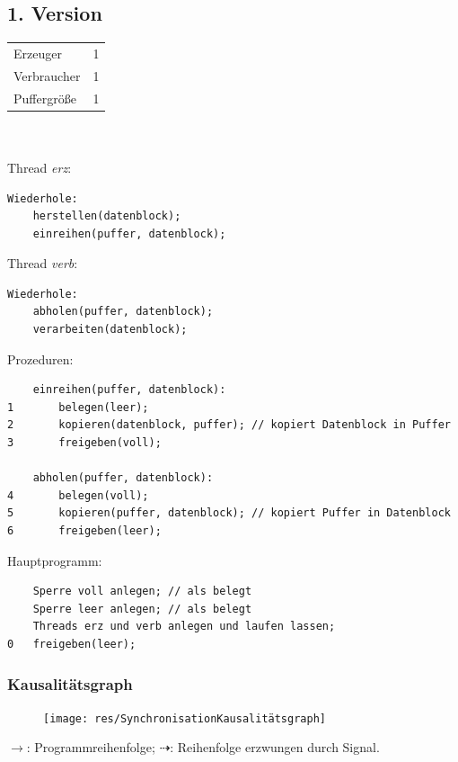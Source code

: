 \subsection*{1. Version}
\begin{tabular}{l r}
Erzeuger & 1\\
Verbraucher & 1\\
Puffergröße & 1
\end{tabular}\\
\\
Thread \emph{erz}:
\begin{lstlisting}
Wiederhole:
	herstellen(datenblock);
	einreihen(puffer, datenblock);
\end{lstlisting}
Thread \emph{verb}:
\begin{lstlisting}
Wiederhole:
	abholen(puffer, datenblock);
	verarbeiten(datenblock);
\end{lstlisting}

Prozeduren:
\begin{lstlisting}
	einreihen(puffer, datenblock):
1		belegen(leer);
2		kopieren(datenblock, puffer); // kopiert Datenblock in Puffer
3		freigeben(voll);

	abholen(puffer, datenblock):
4		belegen(voll);
5		kopieren(puffer, datenblock); // kopiert Puffer in Datenblock
6		freigeben(leer);
\end{lstlisting}

Hauptprogramm:
\begin{lstlisting}
	Sperre voll anlegen; // als belegt
	Sperre leer anlegen; // als belegt
	Threads erz und verb anlegen und laufen lassen;
0	freigeben(leer);
\end{lstlisting}

\subsubsection*{Kausalitätsgraph}
\begin{figure}[H]
	\begin{center}
		\texttt{[image: res/SynchronisationKausalitätsgraph]}
		\label{pic:synkaus}
	\end{center}
\end{figure} 
$\longrightarrow$: Programmreihenfolge; $\dashrightarrow$: Reihenfolge erzwungen durch Signal.

